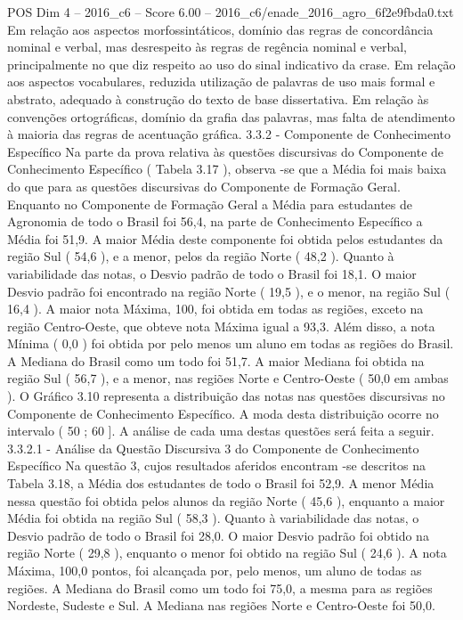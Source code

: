 \begin{textsample}{POS Dim 4 – 2016\_c6 – Score 6.00 – 2016\_c6/enade\_2016\_agro\_6f2e9fbda0.txt}
Em relação aos aspectos morfossintáticos, domínio das regras de concordância nominal e verbal, mas desrespeito às regras de regência nominal e verbal, principalmente no que diz respeito ao uso do sinal indicativo da crase.
Em relação aos aspectos vocabulares, reduzida utilização de palavras de uso mais formal e abstrato, adequado à construção do texto de base dissertativa.
Em relação às convenções ortográficas, domínio da grafia das palavras, mas falta de atendimento à maioria das regras de acentuação gráfica. 3.3.2 - Componente de Conhecimento Específico Na parte da prova relativa às questões discursivas do Componente de Conhecimento Específico ( Tabela 3.17 ), observa -se que a Média foi mais baixa do que para as questões discursivas do Componente de Formação Geral.
Enquanto no Componente de Formação Geral a Média para estudantes de Agronomia de todo o Brasil foi 56,4, na parte de Conhecimento Específico a Média foi 51,9.
A maior Média deste componente foi obtida pelos estudantes da região Sul ( 54,6 ), e a menor, pelos da região Norte ( 48,2 ).
Quanto à variabilidade das notas, o Desvio padrão de todo o Brasil foi 18,1.
O maior Desvio padrão foi encontrado na região Norte ( 19,5 ), e o menor, na região Sul ( 16,4 ).
A maior nota Máxima, 100, foi obtida em todas as regiões, exceto na região Centro-Oeste, que obteve nota Máxima igual a 93,3.
Além disso, a nota Mínima ( 0,0 ) foi obtida por pelo menos um aluno em todas as regiões do Brasil.
A Mediana do Brasil como um todo foi 51,7.
A maior Mediana foi obtida na região Sul ( 56,7 ), e a menor, nas regiões Norte e Centro-Oeste ( 50,0 em ambas ).
O Gráfico 3.10 representa a distribuição das notas nas questões discursivas no Componente de Conhecimento Específico.
A moda desta distribuição ocorre no intervalo ( 50 ; 60 ].
A análise de cada uma destas questões será feita a seguir. 3.3.2.1 - Análise da Questão Discursiva 3 do Componente de Conhecimento Específico Na questão 3, cujos resultados aferidos encontram -se descritos na Tabela 3.18, a Média dos estudantes de todo o Brasil foi 52,9.
A menor Média nessa questão foi obtida pelos alunos da região Norte ( 45,6 ), enquanto a maior Média foi obtida na região Sul ( 58,3 ).
Quanto à variabilidade das notas, o Desvio padrão de todo o Brasil foi 28,0.
O maior Desvio padrão foi obtido na região Norte ( 29,8 ), enquanto o menor foi obtido na região Sul ( 24,6 ).
A nota Máxima, 100,0 pontos, foi alcançada por, pelo menos, um aluno de todas as regiões.
A Mediana do Brasil como um todo foi 75,0, a mesma para as regiões Nordeste, Sudeste e Sul.
A Mediana nas regiões Norte e Centro-Oeste foi 50,0.

\end{textsample}
